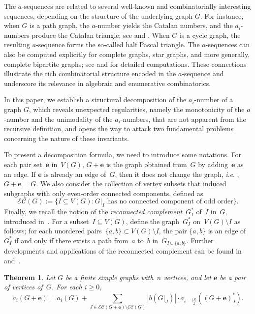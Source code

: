 \documentclass[10pt]{amsart}
\theoremstyle{plain}
\newtheorem{theorem}{Theorem}[section]
\numberwithin{equation}{section}
\theoremstyle{definition}
\newcommand{\edge}{\mathbf{e}}
\newcommand{\EC}{\mathcal{E}\mathcal{C}}
\newcommand{\ie}{\textit{i}.\textit{e}. }
\begin{document}
The $a$-sequences are related to several well-known and combinatorially interesting sequences, depending on the structure of the underlying graph $G$.
For instance, when $G$ is a path graph, the $a$-number yields the Catalan numbers, and the $a_i$-numbers produce the Catalan triangle; see \cite{Choi-Park2015} and \cite{Stanley2015book-Catalan}.
When $G$ is a cycle graph, the resulting $a$-sequence forms the so-called half Pascal triangle.
The $a$-sequences can also be computed explicitly for complete graphs, star graphs, and more generally, complete bipartite graphs; see \cite{Choi-Park2015} and \cite{Seo-Shin2015} for detailed computations.
These connections illustrate the rich combinatorial structure encoded in the $a$-sequence and underscore its relevance in algebraic and enumerative combinatorics.


In this paper, we establish a structural decomposition of the $a_i$-number of a graph $G$, which reveals unexpected regularities, namely the monotonicity of the $a$-number and the unimodality of the $a_i$-numbers, that are not apparent from the recursive definition, and opens the way to attack two fundamental problems concerning the nature of these invariants.

To present a decomposition formula, we need to introduce some notations.
For each pair set~$\edge$ in~$V(G)$, $G + \edge$ is the graph obtained from~$G$ by adding~$\edge$ as an edge. 
If $\edge$ is already an edge of~$G$, then it does not change the graph, \ie, $G+\edge = G$.
We also consider the collection of vertex subsets that induced subgraphs with only even-order connected components, defined as
$$
    \EC(G) := \{I \subseteq V(G) \colon G\vert_I \text{ has no connected component of odd order}\}.
$$
Finally, we recall the notion of the \emph{reconnected complement}~$G^\ast_{I}$  of~$I$ in~$G$, introduced in~\cite{Carr-Devadoss2006}.
For a subset~$I \subseteq V(G)$, define the graph~$G^\ast_{I}$ on~$V(G) \setminus I$ as follows; for each unordered pairs~$\{a,b\} \subset V(G) \setminus I$, the pair $\{a,b\}$ is an edge of $G^\ast_{I}$ if and only if there exists a path from~$a$ to~$b$ in~$G_{I \cup \{a,b\}}$.
Further developments and applications of the reconnected complement can be found in~\cite{Buchstaber-Panov2015} and~\cite{Vladimir-Adam-Denis_2024}.

\begin{theorem}
Let $G$ be a finite simple graphs with~$n$ vertices, and let $\edge$ be a pair of vertices of~$G$.
For each $i \geq 0$, 
    $$
    a_i(G+\edge) = a_i(G) + \sum_{J \in \EC(G+\edge) \setminus \EC(G)}\left\vert  b(G\vert_J) \right\vert \cdot a_{i-\frac{|J|}{2}}((G +\edge)^\ast_{J}).
    $$
\end{theorem}
\end{document}
